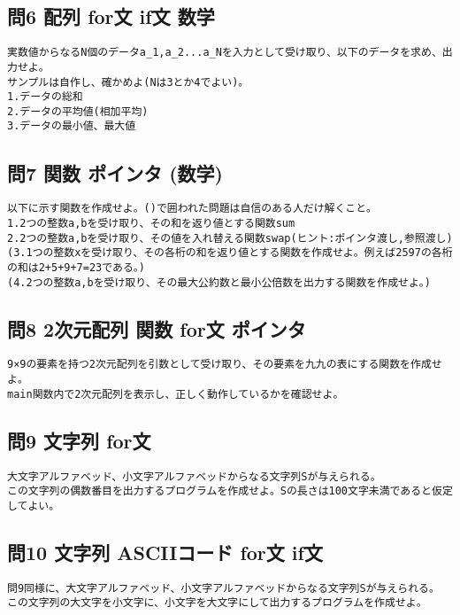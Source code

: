 \subsection{問6 配列 for文 if文 数学}
\begin{verbatim}
実数値からなるN個のデータa_1,a_2...a_Nを入力として受け取り、以下のデータを求め、出力せよ。
サンプルは自作し、確かめよ(Nは3とか4でよい)。
1.データの総和
2.データの平均値(相加平均)
3.データの最小値、最大値
\end{verbatim}

\subsection{問7 関数 ポインタ (数学)}
\begin{verbatim}
以下に示す関数を作成せよ。()で囲われた問題は自信のある人だけ解くこと。
1.2つの整数a,bを受け取り、その和を返り値とする関数sum
2.2つの整数a,bを受け取り、その値を入れ替える関数swap(ヒント:ポインタ渡し,参照渡し)
(3.1つの整数xを受け取り、その各桁の和を返り値とする関数を作成せよ。例えば2597の各桁の和は2+5+9+7=23である。)
(4.2つの整数a,bを受け取り、その最大公約数と最小公倍数を出力する関数を作成せよ。)
\end{verbatim}

\subsection{問8 2次元配列 関数 for文 ポインタ}
\begin{verbatim}
9×9の要素を持つ2次元配列を引数として受け取り、その要素を九九の表にする関数を作成せよ。
main関数内で2次元配列を表示し、正しく動作しているかを確認せよ。
\end{verbatim}

\subsection{問9 文字列 for文}
\begin{verbatim}
大文字アルファベッド、小文字アルファベッドからなる文字列Sが与えられる。
この文字列の偶数番目を出力するプログラムを作成せよ。Sの長さは100文字未満であると仮定してよい。
\end{verbatim}

\subsection{問10 文字列 ASCIIコード for文 if文}
\begin{verbatim}
問9同様に、大文字アルファベッド、小文字アルファベッドからなる文字列Sが与えられる。
この文字列の大文字を小文字に、小文字を大文字にして出力するプログラムを作成せよ。
\end{verbatim}


